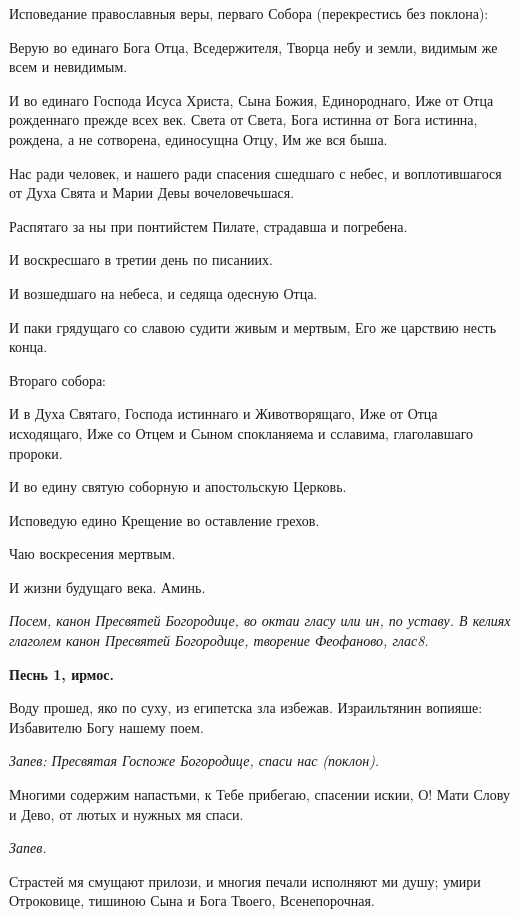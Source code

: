 Исповедание православныя веры, перваго Собора (перекрестись без поклона): 

Верую во единаго Бога Отца, Вседержителя, Творца небу и земли, видимым же всем и невидимым.

И во единаго Господа Исуса Христа, Сына  Божия, Единороднаго, Иже от Отца рожденнаго прежде всех век. Света от Света, Бога истинна от Бога истинна, рождена, а не сотворена, единосущна Отцу, Им же вся быша.

Нас ради человек, и нашего ради спасения сшедшаго с небес, и воплотившагося от Духа Свята и Марии Девы вочеловечьшася.

Распятаго за ны при понтийстем Пилате, страдавша и погребена.

И воскресшаго в третии день по писаниих.

И возшедшаго на небеса, и седяща одесную Отца.

И паки грядущаго со славою судити живым и мертвым, Его же царствию несть конца.

Втораго собора:

И в Духа Святаго, Господа истиннаго и Животворящаго, Иже от Отца исходящаго, Иже со Отцем и Сыном спокланяема  и сславима, глаголавшаго пророки.

И во едину святую соборную и апостольскую Церковь.

Исповедую едино Крещение во оставление грехов.

Чаю воскресения мертвым.

И жизни будущаго века. Аминь.


\itshape Посем, канон Пресвятей Богородице, во октаи гласу или ин, по уставу. В  келиях глаголем канон Пресвятей Богородице, творение Феофаново, глас8. \normalfont{}


\medskip


\bfseries Песнь 1, ирмос.\normalfont{}\nopagebreak


Воду прошед, яко по суху, из египетска зла избежав. Израильтянин вопияше: Избавителю Богу нашему поем.


\itshape Запев:\normalfont{} Пресвятая Госпоже Богородице, спаси нас (поклон).

Многими содержим напастьми, к Тебе прибегаю, спасении искии, О! Мати Слову и Дево, от лютых и нужных мя спаси.


\itshape Запев.\normalfont{}


Страстей мя смущают прилози, и многия печали исполняют ми душу; умири Отроковице, тишиною Сына и Бога Твоего, Всенепорочная.


